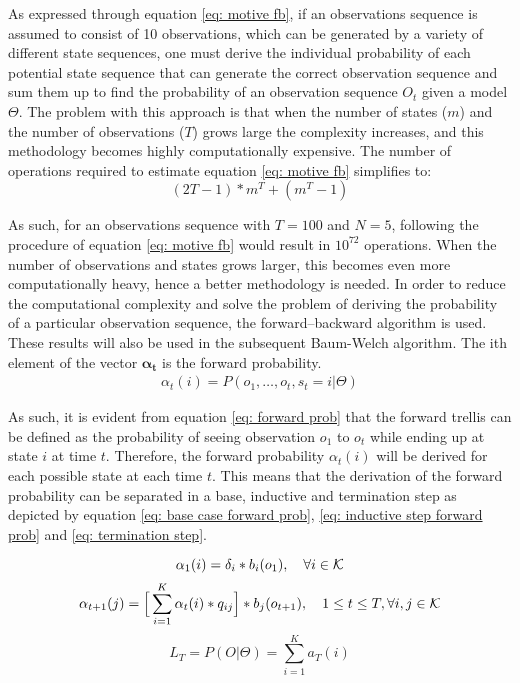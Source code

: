 As expressed through equation \ref{eq: motive fb}, if an observations sequence is assumed to consist of 10 observations, which can be generated by a variety of different state sequences, one must derive the individual probability of each potential state sequence that can generate the correct observation sequence and sum them up to find the probability of  an observation sequence $O_t$ given a model $\Theta$. The problem with this approach is that when the number of states ($m$) and the number of observations ($T$) grows large the complexity increases, and this methodology becomes highly computationally expensive. The number of operations required to estimate equation \ref{eq: motive fb} simplifies to:
\begin{equation}
    (2T-1)*m^T+(m^T-1)
\end{equation}

As such, for an observations sequence with $T = 100$ and $N = 5$, following the procedure of equation \ref{eq: motive fb} would result in $10^{72}$ operations. When the number of observations and states grows larger, this becomes even more computationally heavy, hence a better methodology is needed.  
In order to reduce the computational complexity and solve the problem of deriving the probability of a particular observation sequence, the forward–backward algorithm is used. These results will also be used in the subsequent Baum-Welch algorithm. The ith element of the vector $\mathbf{\alpha_t}$ is the forward probability.
\begin{align}
    \alpha_t(i) = P(o_1,\ldots,o_t, s_t = i | \Theta)
    \label{eq: forward prob}
\end{align}

As such, it is evident from equation \ref{eq: forward prob} that the forward trellis can be defined as the probability of seeing observation $o_1 $ to $o_t$ while ending up at state $i$ at time $t$. Therefore, the forward probability $\alpha_t(i)$ will be derived for each possible state at each time $t$. This means that the derivation of the forward probability can be separated in a base, inductive and termination step as depicted by equation \ref{eq: base case forward prob}, \ref{eq: inductive step forward prob} and \ref{eq: termination step}.

\begin{equation}
    \alpha_1(i) = \delta_i*b_i(o_1),
    \quad  \forall i \in \operatorname{\mathcal{K}}
    \label{eq: base case forward prob}
\end{equation}
\begin{equation}
    \alpha_{t+1}(j) = \Big[\sum_{i=1}^K \alpha_t(i)*q_{ij}\Big] * b_j(o_{t+1}),
    \quad 1\leq t \leq T,
     \forall i,j \in \operatorname{\mathcal{K}}
    \label{eq: inductive step forward prob}
\end{equation}
\begin{equation}
    L_T = P(O|\Theta) = \sum_{i=1}^K a_T(i)
    \label{eq: termination step}
\end{equation}

